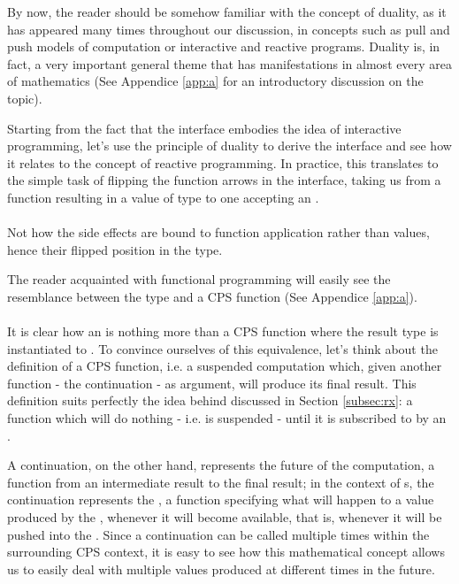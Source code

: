 By now, the reader should be somehow familiar with the concept of duality, as it has appeared many times throughout our discussion, in concepts such as pull and push models of computation or interactive and reactive programs. Duality is, in fact, a very important general theme that has manifestations in almost every area of mathematics\cite{gowers2010princeton} (See Appendice \ref{app:a} for an introductory discussion on the topic). 

Starting from the fact that the  interface embodies the idea of interactive programming, let's use the principle of duality to derive the  interface and see how it relates to the concept of reactive programming. In practice, this translates to the simple task of flipping the function arrows in the  interface, taking us from a function resulting in a value of type  to one accepting an .\\

\\

Not how the side effects are bound to function application rather than values, hence their flipped position in the  type.

The reader acquainted with functional programming will easily see the resemblance between the  type and a CPS function (See Appendice \ref{app:a}).\\

\\

It is clear how an  is nothing more than a CPS function where the result type  is instantiated to . To convince ourselves of this equivalence, let's think about the definition of a CPS function, i.e. a suspended computation which, given another function - the continuation - as argument, will produce its final result. This definition suits perfectly the idea behind  discussed in Section \ref{subsec:rx}: a function which will do nothing - i.e. is suspended - until it is subscribed to by an .

A continuation, on the other hand, represents the future of the computation, a function from an intermediate result to the final result\cite{newbern-monads}; in the context of s, the continuation represents the , a function specifying what will happen to a value produced by the , whenever it will become available, that is, whenever it will be pushed into the . Since a continuation can be called multiple times within the surrounding CPS context, it is easy to see how this mathematical concept allows us to easily deal with multiple values produced at different times in the future.

